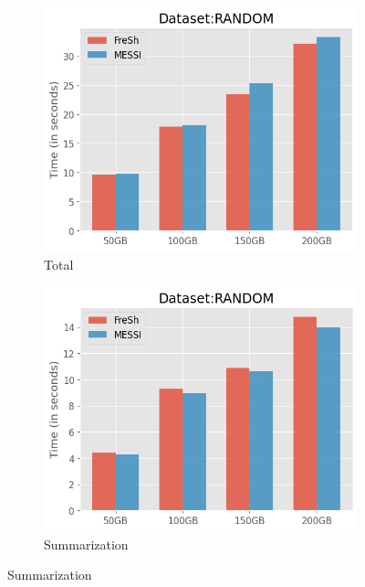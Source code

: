 
\begin{figure}[htbp]
    \centering
    \begin{subfigure}{0.48\textwidth} 
        \includegraphics[width=\textwidth]{figures/Experiments/scale-dataset-random-total.png}
        \caption{Total}
        \label{fig:eval:scale-dataset:random:total}
    \end{subfigure}    
    \begin{subfigure}{0.48\textwidth}
        \includegraphics[width=\textwidth]{figures/Experiments/scale-dataset-random-summarization.png}
        \caption{Summarization}
        \label{fig:eval:scale-dataset:random:summarization}
    \end{subfigure}    


\end{figure}
